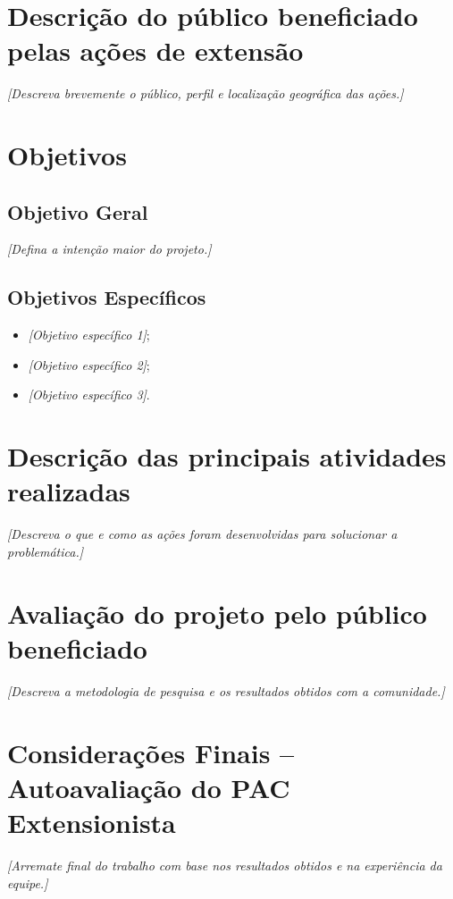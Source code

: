 \documentclass[12pt,a4paper]{article}
\begin{document}
\section{Descrição do público beneficiado pelas ações de extensão}
\textit{[Descreva brevemente o público, perfil e localização geográfica das ações.]}

\section{Objetivos}

\subsection{Objetivo Geral}
\textit{[Defina a intenção maior do projeto.]}

\subsection{Objetivos Específicos}
\begin{itemize}
    \item \textit{[Objetivo específico 1]};
    \item \textit{[Objetivo específico 2]};
    \item \textit{[Objetivo específico 3]}.
\end{itemize}

\section{Descrição das principais atividades realizadas}
\textit{[Descreva o que e como as ações foram desenvolvidas para solucionar a problemática.]}

\section{Avaliação do projeto pelo público beneficiado}
\textit{[Descreva a metodologia de pesquisa e os resultados obtidos com a comunidade.]}

\section{Considerações Finais -- Autoavaliação do PAC Extensionista}
\textit{[Arremate final do trabalho com base nos resultados obtidos e na experiência da equipe.]}
\end{document}
